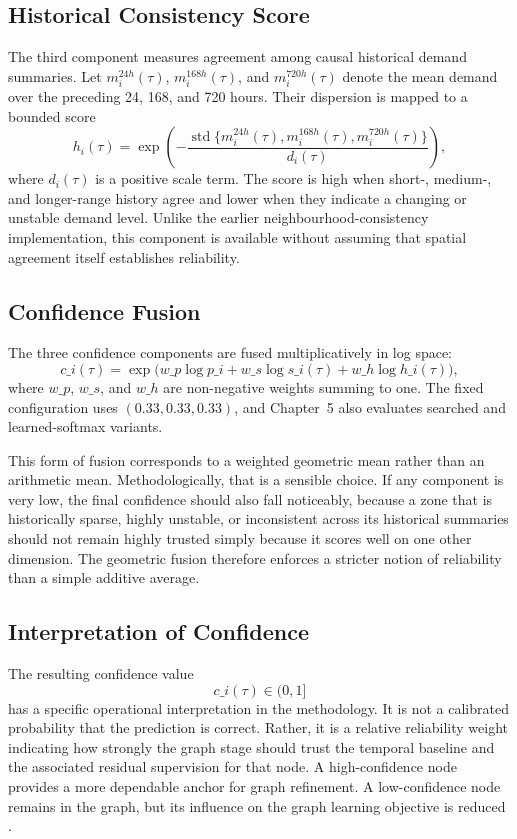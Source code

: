 \documentclass[12pt,a4paper]{report}
\begin{document}
\subsection{Historical Consistency Score}

The third component measures agreement among causal historical demand summaries. Let \(m_i^{24h}(\tau)\), \(m_i^{168h}(\tau)\), and \(m_i^{720h}(\tau)\) denote the mean demand over the preceding 24, 168, and 720 hours. Their dispersion is mapped to a bounded score
\[
h_i(\tau)=\exp\left(-\frac{\operatorname{std}\{m_i^{24h}(\tau),m_i^{168h}(\tau),m_i^{720h}(\tau)\}}{d_i(\tau)}\right),
\]
where \(d_i(\tau)\) is a positive scale term. The score is high when short-, medium-, and longer-range history agree and lower when they indicate a changing or unstable demand level. Unlike the earlier neighbourhood-consistency implementation, this component is available without assuming that spatial agreement itself establishes reliability.

\subsection{Confidence Fusion}

The three confidence components are fused multiplicatively in log space:
\[
c\_i(\tau)
=
\exp\Big(
w\_p \log p\_i
+
w\_s \log s\_i(\tau)
+
w\_h \log h\_i(\tau)
\Big),
\]
where \(w\_p\), \(w\_s\), and \(w\_h\) are non-negative weights summing to one. The fixed configuration uses \((0.33,0.33,0.33)\), and Chapter~5 also evaluates searched and learned-softmax variants.

This form of fusion corresponds to a weighted geometric mean rather than an arithmetic mean. Methodologically, that is a sensible choice. If any component is very low, the final confidence should also fall noticeably, because a zone that is historically sparse, highly unstable, or inconsistent across its historical summaries should not remain highly trusted simply because it scores well on one other dimension. The geometric fusion therefore enforces a stricter notion of reliability than a simple additive average.

\subsection{Interpretation of Confidence}

The resulting confidence value
\[
c\_i(\tau) \in (0,1]
\]
has a specific operational interpretation in the methodology. It is not a calibrated probability that the prediction is correct. Rather, it is a relative reliability weight indicating how strongly the graph stage should trust the temporal baseline and the associated residual supervision for that node. A high-confidence node provides a more dependable anchor for graph refinement. A low-confidence node remains in the graph, but its influence on the graph learning objective is reduced \cite{park2022confidenceaware,wang2024gnnuncertaintysurvey}.
\end{document}
